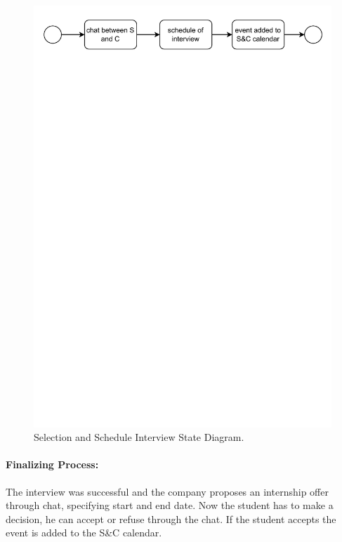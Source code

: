 \begin{figure}[H]
    \begin{center}
        \includegraphics[width=\linewidth]{Images/StateDiagram/SelectionProcess&ScheduleInterview.pdf}
        \caption{Selection and Schedule Interview State Diagram.}
        \label{fig:selection_schedule_interview_state_diag}%
    \end{center}
\end{figure}

\paragraph{Finalizing Process:} The interview was successful and the
  company proposes an internship offer through chat, specifying start
  and end date. Now the student has to make a decision, he can accept or
  refuse through the chat. If the student accepts the event is added to
  the S\&C calendar.

